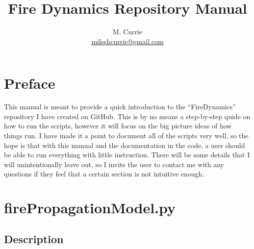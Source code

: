 \documentclass{article}
\begin{document}
\title{Fire Dynamics Repository Manual}
\author{M. Currie \\ \href{mailto:mileshcurrie@gmail.com}{mileshcurrie@gmail.com} }
\maketitle

\section{Preface}
This manual is meant to provide a quick introduction to the ``FireDynamics'' repository I have created on GitHub. This is by no means a step-by-step quide on how to run the scripts, however it will focus on the big picture ideas of how things run. I have made it a point to document all of the scripts very well, so the hope is that with this manual and the documentation in the code, a user should be able to run everything with little instruction. There will be some details that I will unintentionally leave out, so I invite the user to contact me with any questions if they feel that a certain section is not intuitive enough.  

\section{firePropagationModel.py}
\subsection{Description}
\end{document}
